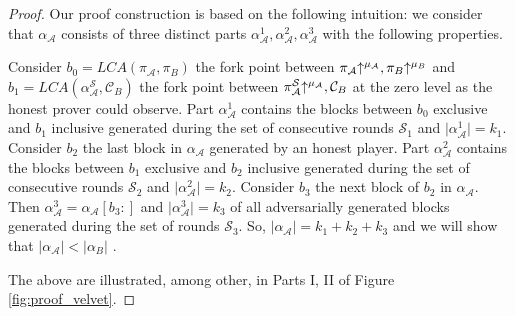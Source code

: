 \begin{proof}
Our proof construction is based on the following intuition: we consider that $\alpha_\mathcal{A}$ consists of three distinct parts $\alpha_\mathcal{A}^1, \alpha_\mathcal{A}^2, \alpha_\mathcal{A}^3$ with the following properties.

Consider $b_0 = LCA(\pi_\mathcal{A}, \pi_B)$ the fork point between $\pi_\mathcal{A} \negthickspace\uparrow^{\mu_\mathcal{A}}, \pi_B \negthickspace\uparrow^{\mu_B}$ and $b_1 = LCA (\alpha^{\mathcal{S}}_\mathcal{A}, \mathcal{C}_B)$ the fork point between $\pi^{\mathcal{S}}_\mathcal{A} \negthickspace\uparrow^{\mu_\mathcal{A}}, \mathcal{C}_B $ at the zero level as the honest prover could observe. Part
$\alpha_\mathcal{A}^1$ contains the blocks between $b_0$ exclusive and $b_1$ inclusive generated during the set of consecutive rounds $\mathcal{S}_1$ and $\lvert  \alpha_\mathcal{A}^1 \rvert = k_1$.
Consider $b_2$ the last block in $\alpha_\mathcal{A}$ generated by an honest player. Part $\alpha_{\mathcal{A}}^2$ contains the blocks between $b_1$ exclusive and $b_2$ inclusive generated during the set of consecutive rounds $\mathcal{S}_2$ and $\vert  \alpha_\mathcal{A}^2 \vert = k_2$. Consider $b_3$ the next block of $b_2$ in $\alpha_\mathcal{A}$. Then $\alpha_{\mathcal{A}}^3 = \alpha_\mathcal{A}[b_3:]$ and $\vert  \alpha_\mathcal{A}^3 \vert = k_3$ of all adversarially generated blocks generated during the set of rounds $\mathcal{S}_3$. So, $\vert \alpha_\mathcal{A} \vert = k_1 + k_2 + k_3$ and we will show that $\vert \alpha_\mathcal{A} \vert < \vert \alpha_B \vert$ .

The above are illustrated, among other, in Parts I, II of Figure \ref{fig:proof_velvet}.


\end{proof}
